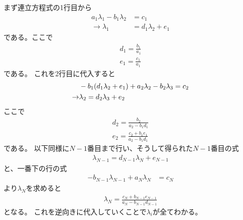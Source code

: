 \documentclass[uplatex]{jsarticle}
\begin{document}
まず連立方程式の1行目から
\begin{align}
    a_1 \lambda_1 - b_1 \lambda_2 &= c_1 \\
    \rightarrow
    \lambda_1 &= d_1 \lambda_2 + e_1
\end{align}
である。ここで
\begin{align}
    d_1 = \frac{b_1}{a_1} \\
    e_1 = \frac{c_1}{a_1}
\end{align}
である。
これを2行目に代入すると
\begin{align}
    & -b_1\qty(d_1 \lambda_2 + e_1) + a_2 \lambda_2 - b_2 \lambda_3 = c_2 \\
    \rightarrow &
    \lambda_2 = d_2\lambda_3 + e_2
\end{align}
ここで
\begin{align}
    d_2 = \frac{b_2}{a_2 - b_1 d_1} \\
    e_2 = \frac{c_2 + b_1 e_1}{a_2 - b_1 d_1}
\end{align}
である。
以下同様に$N-1$番目まで行い、そうして得られた$N-1$番目の式
\begin{align}
    \lambda_{N-1} = d_{N-1}\lambda_N + e_{N-1}
\end{align}
と、一番下の行の式
\begin{align}
    -b_{N-1} \lambda_{N-1} + a_N \lambda_N &= c_N
\end{align}
より$\lambda_N$を求めると
\begin{align}
    \lambda_N = \frac{c_N + b_{N-1} e_{N-1}}{a_N - b_{N-1} d_{N-1}}
\end{align}
となる。
これを逆向きに代入していくことで$\lambda_i$が全てわかる。



\end{document}
